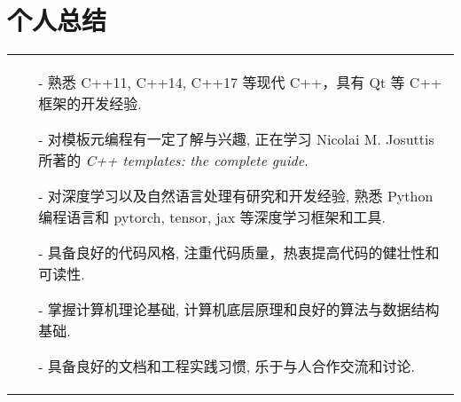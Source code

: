 \documentclass[a4paper,12pt]{ctexart}
\begin{document}
\section{个人总结}
\begin{tabularx}{\linewidth}{ X@{}  }
\begin{minipage}[t]{\linewidth}
    \begin{itemize}[nosep,after=\strut, leftmargin=1em, itemsep=3pt]
        \item[-] 熟悉 C++11, C++14, C++17 等现代 C++，具有 Qt 等 C++ 框架的开发经验.
        \item[-] 对模板元编程有一定了解与兴趣, 正在学习 Nicolai M. Josuttis 所著的 \textit{C++ templates: the complete guide}.
        \item[-] 对深度学习以及自然语言处理有研究和开发经验, 熟悉 Python 编程语言和 pytorch, tensor, jax 等深度学习框架和工具.
        \item[-] 具备良好的代码风格, 注重代码质量，热衷提高代码的健壮性和可读性.
        \item[-] 掌握计算机理论基础, 计算机底层原理和良好的算法与数据结构基础.
        \item[-] 具备良好的文档和工程实践习惯, 乐于与人合作交流和讨论.
    \end{itemize}
\end{minipage}\\
\end{tabularx}
\vfill
{}
\end{document}
